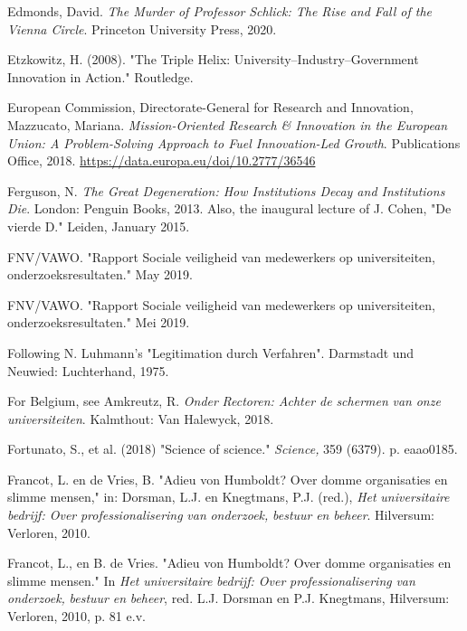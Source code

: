 \documentclass[smallauthor, chapterhaspagenum, nochapterinheader, pagenuminheader,  bigchapnum,medium2, tocpages,  garamond, titleinheader]{jote-book}
\begin{document}
\begin{references}
		Edmonds, David. \emph{The Murder of Professor }\emph{Schlick}\emph{: The Rise and Fall of the Vienna Circle}. Princeton University Press, 2020.



		Etzkowitz, H. (2008). "The Triple Helix: University--Industry--Government Innovation in Action." Routledge.



		European Commission, Directorate-General for Research and Innovation, Mazzucato, Mariana. \emph{Mission-Oriented Research \& Innovation in the European Union: A Problem-Solving Approach to Fuel Innovation-Led Growth}. Publications Office, 2018. \href{https://data.europa.eu/doi/10.2777/36546}{https://data.europa.eu/doi/10.2777/36546}



		Ferguson, N. \emph{The Great Degeneration: How Institutions Decay and Institutions Die}. London: Penguin Books, 2013. Also, the inaugural lecture of J. Cohen, "De vierde D." Leiden, January 2015.



		FNV/VAWO. "Rapport Sociale veiligheid van medewerkers op universiteiten, onderzoeksresultaten." May 2019.



		FNV/VAWO. "Rapport Sociale veiligheid van medewerkers op universiteiten, onderzoeksresultaten." Mei 2019.



		Following N. Luhmann's "Legitimation durch Verfahren". Darmstadt und Neuwied: Luchterhand, 1975.



		For Belgium, see Amkreutz, R. \emph{Onder}\emph{ }\emph{Rectoren}\emph{: Achter de }\emph{schermen}\emph{ van }\emph{onze}\emph{ }\emph{universiteiten}. Kalmthout: Van Halewyck, 2018.



		Fortunato, S., et al. (2018) "Science of science." \emph{Science, }359 (6379). p. eaao0185.



		Francot, L. en de Vries, B. "Adieu von Humboldt? Over domme organisaties en slimme mensen," in: Dorsman, L.J. en Knegtmans, P.J. (red.), \emph{Het }\emph{universitaire}\emph{ }\emph{bedrijf}\emph{: Over }\emph{professionalisering}\emph{ van }\emph{onderzoek}\emph{, }\emph{bestuur}\emph{ }\emph{en}\emph{ }\emph{beheer}. Hilversum: Verloren, 2010.



		Francot, L., en B. de Vries. "Adieu von Humboldt? Over domme organisaties en slimme mensen." In \emph{Het }\emph{universitaire}\emph{ }\emph{bedrijf}\emph{: Over }\emph{professionalisering}\emph{ van }\emph{onderzoek}\emph{, }\emph{bestuur}\emph{ }\emph{en}\emph{ }\emph{beheer}, red. L.J. Dorsman en P.J. Knegtmans, Hilversum: Verloren, 2010, p. 81 e.v.




\end{references}
\end{document}
